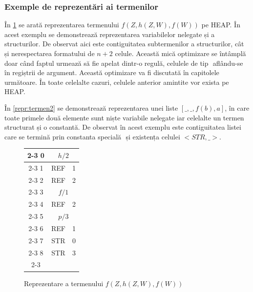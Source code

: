 \documentclass[12pt,a4paper,twoside]{report}
\begin{document}
\subsubsection{Exemple de reprezentări ai termenilor}
În \ref{repr:termen1} se arată reprezentarea termenului \(f(Z, h(Z, W),f(W))\) pe HEAP.  În acest exemplu se demonstrează reprezentarea variabilelor nelegate și a structurilor. De observat aici este contiguitatea subtermenilor a structurilor, cât și nerespectarea formatului de \(n+2\) celule. Această mică optimizare se întâmplă doar când faptul urmează să fie apelat dintr-o  regulă, celulele de tip \(<STR, a>\) aflându-se în regiștrii de argument. Această optimizare va fi discutată în capitolele următoare. În toate celelalte cazuri, celulele anterior amintite vor exista pe HEAP. 

În \ref{repr:termen2} se demonstrează reprezentarea unei liste \([\_, \_, f(b), a]\), în care toate primele două elemente sunt niște variabile nelegate iar celelalte un termen structurat și o constantă. De observat în acest exemplu este contiguitatea listei care se termină prin constanta specială \(<CON, NIL>\) și existența celulei \(<STR, \_>\).

\begin{figure}
\begin{center}
\begin{tabular}{c|c|c|}
\cline{2-3}
0 & \multicolumn{2}{|c|}{\(h/2\)} \\
\cline{2-3}
1 & REF & 1 \\
\cline{2-3}
2 & REF & 2 \\
\cline{2-3}
3 & \multicolumn{2}{|c|}{\(f/1\)} \\
\cline{2-3}
4 & REF & 2 \\
\cline{2-3}
5 & \multicolumn{2}{|c|}{\(p/3\)} \\
\cline{2-3}
6 & REF & 1 \\
\cline{2-3}
7 & STR & 0 \\
\cline{2-3}
8 & STR & 3 \\
\cline{2-3}
\end{tabular}
\end{center}
\caption{Reprezentare a termenului \(f(Z, h(Z, W),f(W))\)} \label{repr:termen1}
\end{figure}
\end{document}
